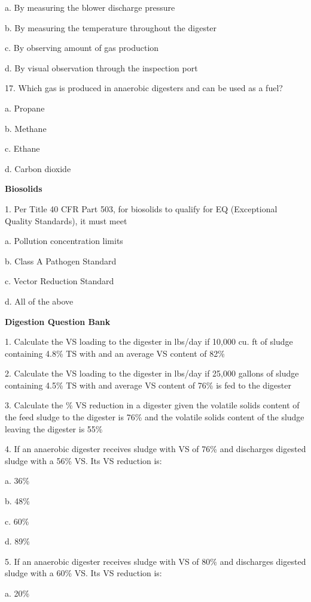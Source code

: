 \documentclass{article}
\begin{document}
a. By measuring the blower discharge pressure 

b. By measuring the temperature throughout the digester 

c. By observing amount of gas production 

d. By visual observation through the inspection port 


17. Which gas is produced in anaerobic digesters and can be used as a fuel? 

a. Propane 

b. Methane 

c. Ethane 

d. Carbon dioxide 


\textbf{Biosolids}

1. Per Title 40 CFR Part 503, for biosolids to qualify for EQ (Exceptional Quality Standards), it must meet 

a. Pollution concentration limits 

b. Class A Pathogen Standard 

c. Vector Reduction Standard 

d. All of the above 


\textbf{Digestion Question Bank}

1. Calculate the VS loading to the digester in lbs/day if 10,000 cu. ft of sludge containing 4.8\% TS with and an average VS content of 82\%



2. Calculate the VS loading to the digester in lbs/day if 25,000 gallons of sludge containing 4.5\% TS with and average VS content of 76\% is fed to the digester



3. Calculate the \% VS reduction in a digester given the volatile solids content of the feed sludge to the digester is 76\% and the volatile solids content of the sludge leaving the digester is 55\%



4. If an anaerobic digester receives sludge with VS of 76\% and discharges digested sludge with a 56\% VS. Its VS reduction is:

a. 36\% 

b. 48\% 

c. 60\% 

d. 89\% 


5. If an anaerobic digester receives sludge with VS of 80\% and discharges digested sludge with a 60\% VS. Its VS reduction is:

a. 20\% 
\end{document}
